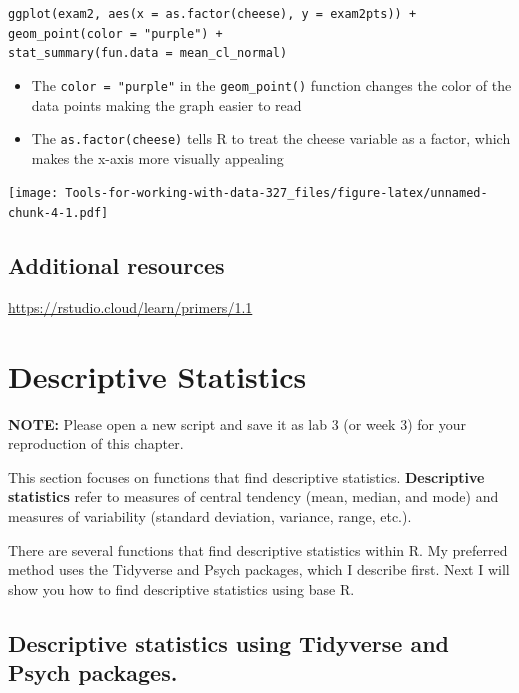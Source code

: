 \documentclass[
]{book}
\providecommand{\tightlist}{%
  \setlength{\itemsep}{0pt}\setlength{\parskip}{0pt}}
\begin{document}
\texttt{ggplot(exam2,\ aes(x\ =\ as.factor(cheese),\ y\ =\ exam2pts))\ +}\\
\texttt{geom\_point(color\ =\ "purple")\ +}~\\
\texttt{stat\_summary(fun.data\ =\ mean\_cl\_normal)}

\begin{itemize}
\tightlist
\item
  The \texttt{color\ =\ "purple"} in the \texttt{geom\_point()} function changes the color of the data points making the graph easier to read\\
\item
  The \texttt{as.factor(cheese)} tells R to treat the cheese variable as a factor, which makes the x-axis more visually appealing
\end{itemize}

\texttt{[image: Tools-for-working-with-data-327\_files/figure-latex/unnamed-chunk-4-1.pdf]}

\hypertarget{additional-resources}{%
\section{Additional resources}\label{additional-resources}}

\url{https://rstudio.cloud/learn/primers/1.1}

\hypertarget{descriptive-statistics}{%
\chapter{Descriptive Statistics}\label{descriptive-statistics}}

\textbf{NOTE:} Please open a new script and save it as lab 3 (or week 3) for your reproduction of this chapter.

This section focuses on functions that find descriptive statistics. \textbf{Descriptive statistics} refer to measures of central tendency (mean, median, and mode) and measures of variability (standard deviation, variance, range, etc.).

There are several functions that find descriptive statistics within R. My preferred method uses the Tidyverse and Psych packages, which I describe first. Next I will show you how to find descriptive statistics using base R.

\hypertarget{descriptive-statistics-using-tidyverse-and-psych-packages.}{%
\section{Descriptive statistics using Tidyverse and Psych packages.}\label{descriptive-statistics-using-tidyverse-and-psych-packages.}}
\end{document}
